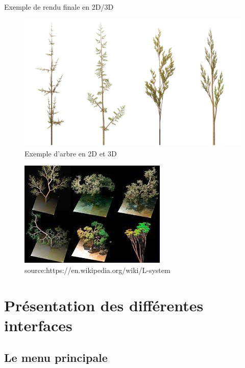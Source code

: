 \documentclass{beamer}
\begin{document}
\begin{frame}
%
\begin{exampleblock}{Exemple de rendu finale en 2D/3D}

	\begin{figure}[h]
	\includegraphics[scale=0.1]{images/exemple2D.png}
	\caption{Exemple d'arbre en 2D et 3D}
	\end{figure}

	\begin{figure}[h]
	\includegraphics[scale=0.3]{images/exemple3D.png}
	\caption{source:https://en.wikipedia.org/wiki/L-system}
	\end{figure}
	\end{exampleblock}

\end{frame}


\section{Présentation des différentes interfaces}

\subsection{Le menu principale}
\end{document}
